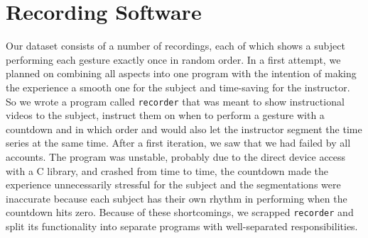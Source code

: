 \section{Recording Software}
\label{sec:recording}

Our dataset consists of a number of recordings, each of which shows a subject
performing each gesture exactly once in random order. In a first attempt, we
planned on combining all aspects into one program with the intention of making
the experience a smooth one for the subject and time-saving for the instructor.
So we wrote a program called \texttt{recorder} that was meant to show
instructional videos to the subject, instruct them on when to perform a gesture
with a countdown and in which order and would also let the instructor segment
the time series at the same time. After a first iteration, we saw that we had
failed by all accounts. The program was unstable, probably due to the direct
device access with a C library, and crashed from time to time, the countdown
made the experience unnecessarily stressful for the subject and the
segmentations were inaccurate because each subject has their own rhythm in
performing when the countdown hits zero. Because of these shortcomings, we
scrapped \texttt{recorder} and split its functionality into separate programs
with well-separated responsibilities.

